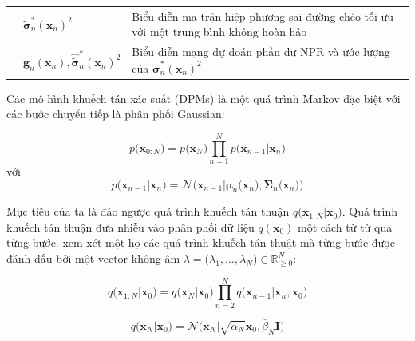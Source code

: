 \documentclass[14pt, a4paper]{article}
\numberwithin{equation}{section}
\numberwithin{figure}{section}
\numberwithin{dl}{section}
\numberwithin{md}{section}
\numberwithin{bd}{section}
\numberwithin{dn}{section}
\numberwithin{hq}{section}
\begin{document}
\begin{table}[h!]
\begin{tabular} [c c c] {m{4cm}  m{2.5cm}  m{8cm}}
            & $\tilde{\boldsymbol{\sigma}}_n^{\ast} (\boldsymbol{x}_n)^2$ & Biểu diễn ma trận hiệp phương sai đường chéo tối ưu với một trung bình không hoàn hảo \\ \cline{2-3}
            & $\boldsymbol{g}_n (\boldsymbol{x}_n), \hat{\tilde{\boldsymbol{\sigma}}}_n^{\ast} (\boldsymbol{x}_n)^2$ & Biểu diễn mạng dự đoán phần dư NPR và ước lượng của $\tilde{\boldsymbol{\sigma}}_n^{\ast} (\boldsymbol{x}_n)^2$ \\
            \hline
        \end{tabular}
    \end{table}

    Các mô hình khuếch tán xác suất (DPMs) là một quá trình Markov đặc biệt với các bước chuyển tiếp là phân phối Gaussian:

    \begin{equation} \label{eq:Reverse-Process}
        p\big(\boldsymbol{x}_{0:N}\big)=p\big(\boldsymbol{x}_N\big)\prod_{n=1}^N p\big(\boldsymbol{x}_{n-1} \vert \boldsymbol{x}_n\big)
    \end{equation}
    với
    \begin{equation}
        p\big(\boldsymbol{x}_{n-1} \vert \boldsymbol{x}_n \big)=\mathcal{N} \big( \boldsymbol{x}_{n-1} \vert \boldsymbol{\mu}_n \big( \boldsymbol{x}_n \big), \boldsymbol{\Sigma}_n \big( \boldsymbol{x}_n \big) \big)
    \end{equation}

    Mục tiêu của ta là đảo ngược quá trình khuếch tán thuận $q\big(\boldsymbol{x}_{1:N} \vert \boldsymbol{x}_0\big)$. 
    Quá trình khuếch tán thuận đưa nhiễu vào phân phối dữ liệu $q(\boldsymbol{x}_0)$ một cách từ từ qua từng bước.
    \cite{song2020denoising} xem xét một họ các quá trình khuếch tán thuật mà từng bước được đánh dấu bởi một vector không âm $\lambda = \big( \lambda_1, \dots, \lambda_N \big) \in \mathbb{R}_{\geq 0}^{N}$:

    \begin{equation} \label{eq:Forward-Process}
        q\big(\boldsymbol{x}_{1:N} \vert \boldsymbol{x}_0 \big)=q\big( \boldsymbol{x}_N \vert \boldsymbol{x}_0 \big) \prod_{n=2}^{N} q\big( \boldsymbol{x}_{n-1} \vert \boldsymbol{x}_n, \boldsymbol{x}_0 \big)
    \end{equation}

    \begin{equation}
        q\big( \boldsymbol{x}_N \vert \boldsymbol{x}_0 \big)=\mathcal{N} \big( \boldsymbol{x}_N \vert \sqrt{\overline{\alpha}_N} \boldsymbol{x}_0, \overline{\beta}_N \boldsymbol{I} \big)
    \end{equation}
\end{document}
